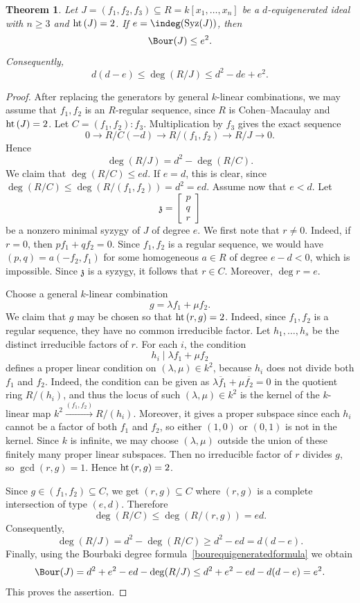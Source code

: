 \documentclass[11pt]{amsart} %
\newtheorem{Theorem}{Theorem}[section]
\theoremstyle{definition}
\def\hht{{\rm ht}\,}
\def\syz{\mbox{\rm Syz}}
\def\hht{{\rm ht}\,}
\begin{document}
\begin{Theorem}\label{BourBoundEquigenerated}
Let $J=(f_1,f_2,f_3)\subseteq R=k[x_1,\ldots,x_n]$ be a $d$-equigenerated ideal with $n\geq 3$ and $\hht(J)=2$. If $e = \indeg(\syz(J))$, then
\[
\Bour(J)\leq e^2.
\]
Consequently,
\[
d(d-e)\leq \deg(R/J)\leq d^2-de+e^2.
\]
\end{Theorem}
\begin{proof}
After replacing the generators by general $k$-linear combinations, we may assume that $f_1,f_2$ is an $R$-regular sequence, since $R$ is Cohen--Macaulay and $\hht(J) = 2$. Let $C=(f_1,f_2):f_3$. Multiplication by $f_3$ gives the exact sequence
\[
0\to R/C(-d)\to R/(f_1,f_2)\to R/J\to 0.
\]
Hence
\begin{equation}\label{formula1}
    \deg(R/J)=d^2-\deg(R/C).
\end{equation}
We claim that $\deg(R/C)\leq ed$. If $e=d$, this is clear, since $\deg(R/C)\leq \deg(R/(f_1,f_2))=d^2=ed$.
Assume now that $e<d$. Let
\[
\mathfrak z=\begin{bmatrix}p\\ q\\ r\end{bmatrix}
\]
be a nonzero minimal syzygy of $J$ of degree $e$. We first note that $r\neq 0$. Indeed, if $r=0$, then $pf_1+qf_2=0$. Since $f_1,f_2$ is a regular sequence, we would have $(p,q)=a(-f_2,f_1)$ for some homogeneous $a\in R$ of degree $e-d<0$, which is impossible.
Since $\mathfrak z$ is a syzygy, it follows that $r\in C$. Moreover, $\deg r=e$.

Choose a general $k$-linear combination
\[
g=\lambda f_1+\mu f_2.
\]
We claim that $g$ may be chosen so that $\hht(r,g)=2$. Indeed, since
$f_1,f_2$ is a regular sequence, they have no common irreducible factor.
Let $h_1,\ldots,h_s$ be the distinct irreducible factors of $r$. For each
$i$, the condition
\[
h_i\mid \lambda f_1+\mu f_2
\]
defines a proper linear condition on $(\lambda,\mu)\in k^2$, because $h_i$ does not divide both $f_1$ and $f_2$. Indeed, the condition can be given as $\lambda \overline{f}_1 + \mu \overline{f_2} = 0$ in the quotient ring $R/(h_i)$, and thus the locus of such $(\lambda, \mu) \in k^2$ is the kernel of the $k$-linear map $k^2 \xrightarrow{(f_1, f_2)} R/(h_i)$. Moreover, it gives a proper subspace since each $h_i$ cannot be a factor of both $ f_1$ and $ f_2$, so either $(1,0)$ or $(0,1)$ is not in the kernel. Since $k$ is infinite, we may choose $(\lambda,\mu)$ outside the union of these finitely many proper linear
subspaces. Then no irreducible factor of $r$ divides $g$, so $\gcd(r,g)=1$. Hence $\hht(r,g)=2$.

Since $g\in (f_1,f_2)\subseteq C$, we get 
$(r,g)\subseteq C$ where $(r,g)$ is a complete  intersection of type $(e,d)$. Therefore
\[
\deg(R/C)\leq \deg(R/(r,g))=ed.
\]
Consequently,
\[
\deg(R/J)=d^2-\deg(R/C)\geq d^2-ed=d(d-e).
\]
Finally, using the Bourbaki degree formula~\eqref{bourequigeneratedformula}
we obtain
\[
\Bour(J)
=d^2+e^2-ed-\deg(R/J)
\leq d^2+e^2-ed-d(d-e)
=e^2.
\]
This proves the assertion.
\end{proof}
\end{document}
